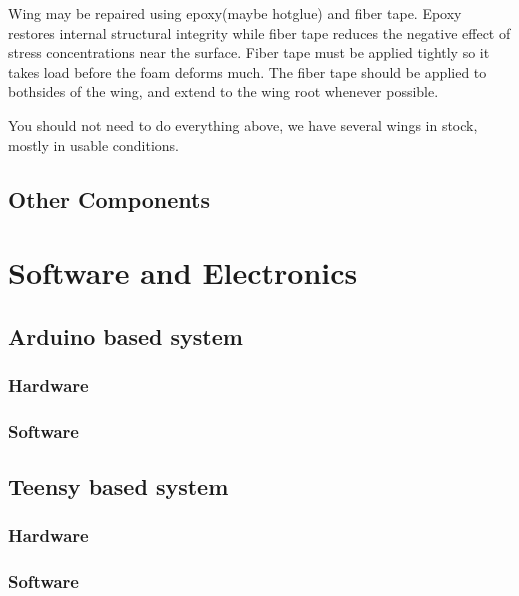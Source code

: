 \documentclass[12pt]{article}
\begin{document}
Wing may be repaired using epoxy(maybe hotglue) and fiber tape. Epoxy restores internal structural integrity while fiber tape reduces the negative effect of stress concentrations near the surface. Fiber tape must be applied tightly so it takes load before the foam deforms much. The fiber tape should be applied to bothsides of the wing, and extend to the wing root whenever possible. 

You should not need to do everything above, we have several wings in stock, mostly in usable conditions. 

\subsection{Other Components}


\section{Software and Electronics}
\subsection{Arduino based system}
\subsubsection{Hardware}
\subsubsection{Software}

\subsection{Teensy based system}
\subsubsection{Hardware}
\subsubsection{Software}
\end{document}
